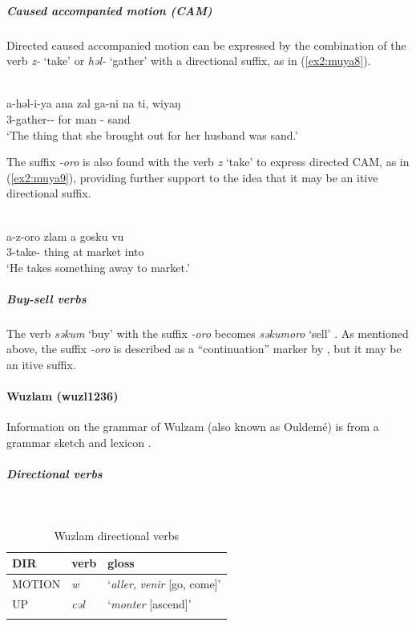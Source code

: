 \subparagraph{Caused accompanied motion (CAM)}

Directed caused accompanied motion can be expressed by the combination of the verb \textit{z-} `take' or \textit{həl-} `gather' with a directional suffix, as in (\ref{ex2:muya8}).

\ea\label{ex2:muya8}
 \\
\gll a-həl-i-ya ana zal ga-ni na ti, wiyaŋ \\
3-gather-- for man -   sand \\
\glt `The thing that she brought out for her husband was sand.'
\z 

The suffix \textit{-oro} is also found with the verb \textit{z} `take' to express directed CAM, as in (\ref{ex2:muya9}), providing further support to the idea that it may be an itive directional suffix. 

\ea\label{ex2:muya9}
 \\
\gll a-z-oro zlam a gosku vu \\
3-take- thing at market into \\
\glt `He takes something away to market.'
\z 

\subparagraph{Buy-sell verbs}

The verb \textit{səkum} `buy' with the suffix \textit{-oro} becomes \textit{səkumoro} `sell' \citep[79]{smithMuyangProvisionalLexicon2003}. As mentioned above, the suffix \textit{-oro} is described as a ``continuation'' marker by \citet{smithMuyangVerbPhrase2002}, but it may be an itive suffix.

\paragraph*{Wuzlam (wuzl1236)} \label{wuzl}

Information on the grammar of Wulzam (also known as Ouldemé) is from a grammar sketch and lexicon \citep{colombelLangueOuldemeNordCameroun2005}.

\subparagraph{Directional verbs}~

\begin{table}[H]
	\caption{Wuzlam directional verbs} 
	\label{tab:wuzlV}
	\begin{tabular}{lll} %
		\lsptoprule
		DIR & verb & gloss   \\ %
		\midrule
		MOTION & \textit{w} & `\textit{aller}, \textit{venir} [go, come]' \\
		UP & \textit{cəl} & `\textit{monter} [ascend]' \\
		\lspbottomrule
	\end{tabular}
\end{table}

